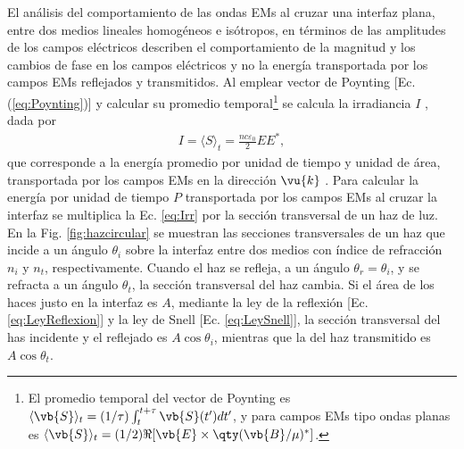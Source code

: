 El análisis del comportamiento de las ondas EMs al cruzar una interfaz plana, entre dos medios lineales homogéneos e isótropos, en términos de las amplitudes de los campos eléctricos describen el comportamiento de la magnitud y los cambios de fase en los campos eléctricos y no la energía transportada por los campos EMs reflejados y transmitidos. Al emplear vector de Poynting [Ec. (\ref{eq:Poynting})] y calcular su promedio temporal\footnote{El promedio temporal del vector de Poynting es $\langle\vb{S}\rangle_t = (1/\tau)\int_t^{t+\tau}\vb{S}(t')dt'$, y para campos EMs tipo ondas planas es $\langle\vb{S}\rangle_t = (1/2) \Re[\vb{E}\times\qty(\vb{B}/\mu)^*]$.} se calcula la irradiancia $I$ \cite{hecht1998optics}, dada por
	\begin{align}
	I = \langle S \rangle_t = \frac{nc\varepsilon_0}{2} EE^*,
	\label{eq:Irr}
	\end{align}
que corresponde a la energía promedio por unidad de tiempo y unidad de área, transportada por los campos EMs en la dirección $\vu{k}$ \cite{griffiths2013electrodynamics}. Para calcular la energía por unidad de tiempo $P$ transportada por los campos EMs al cruzar la interfaz se multiplica la Ec. \eqref{eq:Irr} por la sección transversal de un haz de luz. En la Fig. \ref{fig:hazcircular} se muestran las secciones transversales de un haz  que incide a un ángulo $\theta_i$ sobre la interfaz entre dos medios con índice de refracción $n_i$ y $n_t$, respectivamente. Cuando el haz se refleja, a un ángulo $\theta_r=\theta_i$, y se refracta a un ángulo $\theta_t$, la sección transversal del haz cambia. Si el área de los haces justo en la interfaz es $A$, mediante la ley de la reflexión [Ec. \eqref{eq:LeyReflexion}] y la ley de Snell [Ec. \eqref{eq:LeySnell}], la sección transversal del has incidente y el reflejado  es $A\cos\theta_i$, mientras que la del haz transmitido es $A\cos\theta_t$.

